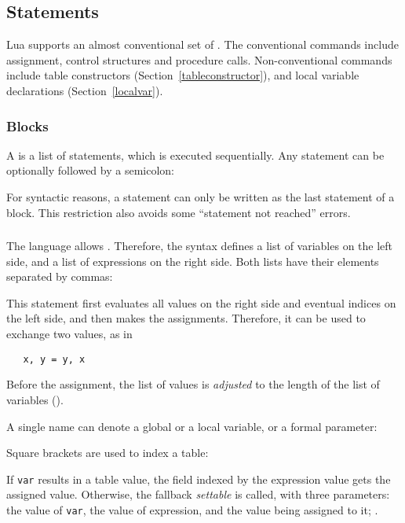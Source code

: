 \subsection{Statements}

Lua supports an almost conventional set of .
The conventional commands include
assignment, control structures and procedure calls.
Non-conventional commands include table constructors
(Section~\ref{tableconstructor}),
and local variable declarations (Section~\ref{localvar}).

\subsubsection{Blocks}
A  is a list of statements, which is executed sequentially.
Any statement can be optionally followed by a semicolon:
\begin{Produc}
\end{Produc}%
For syntactic reasons, a  statement can only be written
as the last statement of a block.
This restriction also avoids some ``statement not reached'' errors.

\subsubsection{} \label{assignment}
The language allows .
Therefore, the syntax defines a list of variables on the left side,
and a list of expressions on the right side.
Both lists have their elements separated by commas:
\begin{Produc}
\end{Produc}%
This statement first evaluates all values on the right side
and eventual indices on the left side,
and then makes the assignments.
Therefore, it can be used to exchange two values, as in
\begin{verbatim}
   x, y = y, x
\end{verbatim}
Before the assignment, the list of values is {\em adjusted} to
the length of the list of variables ().

A single name can denote a global or a local variable,
or a formal parameter:
\begin{Produc}
\end{Produc}%
Square brackets are used to index a table:
\begin{Produc}
\end{Produc}%
If \verb'var' results in a table value,
the field indexed by the expression value gets the assigned value.
Otherwise, the fallback {\em settable} is called,
with three parameters: the value of \verb'var',
the value of expression, and the value being assigned to it;
.

